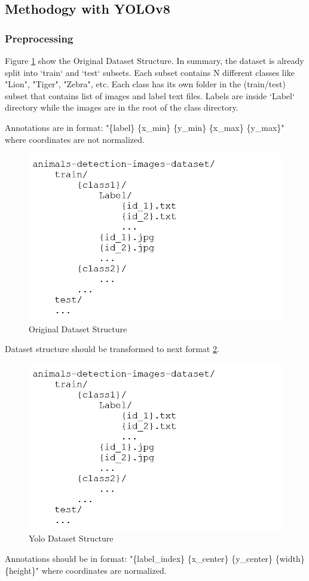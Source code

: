 \documentclass[conference]{IEEEtran}
\begin{document}
\subsection{Methodogy with YOLOv8}
\subsubsection{Preprocessing}

Figure \ref{fig:orginalDST} show the Original Dataset Structure. In summary, the dataset is already split into `train` and `test` subsets. Each subset contains N different classes like "Lion", "Tiger", "Zebra", etc. Each class has its own folder in the (train/test) subset that contains list of images and label text files. Labels are inside `Label` directory while the images are in the root of the class directory. 

Annotations are in format: "\{label\} \{x\_min\} \{y\_min\} \{x\_max\} \{y\_max\}" where coordinates are not normalized.

\begin{figure}[htbp]
    \centering
    \includegraphics[width=3 in]{fig2.png}
    \caption{Original Dataset Structure }
    \label{fig:orginalDST}
\end{figure}
Dataset structure should be transformed to next format \ref{fig:YoloDST}.

\begin{figure}[htbp]
    \centering
    \includegraphics[width=3 in]{fig2.png}
    \caption{ Yolo Dataset Structure}
    \label{fig:YoloDST}
\end{figure}
Annotations should be in format: "\{label\_index\} \{x\_center\} \{y\_center\} \{width\} \{height\}" where coordinates are normalized.
\end{document}
